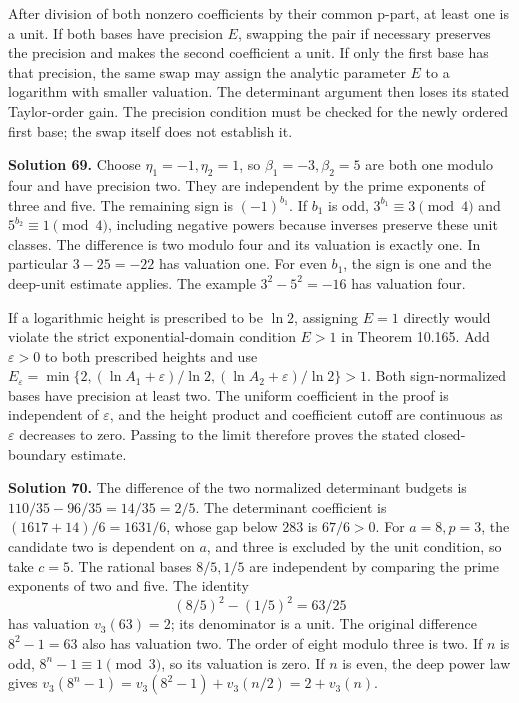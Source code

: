 \documentclass[
  11pt,
  a4paper,
]{article}
\begin{document}
After division of both nonzero coefficients by their common p-part, at
least one is a unit. If both bases have precision \(E\), swapping the
pair if necessary preserves the precision and makes the second
coefficient a unit. If only the first base has that precision, the same
swap may assign the analytic parameter \(E\) to a logarithm with smaller
valuation. The determinant argument then loses its stated Taylor-order
gain. The precision condition must be checked for the newly ordered
first base; the swap itself does not establish it.

\textbf{Solution 69.} Choose \(\eta_1=-1,\eta_2=1\), so
\(\beta_1=-3,\beta_2=5\) are both one modulo four and have precision
two. They are independent by the prime exponents of three and five. The
remaining sign is \((-1)^{b_1}\). If \(b_1\) is odd,
\(3^{b_1}\equiv3\pmod4\) and \(5^{b_2}\equiv1\pmod4\), including
negative powers because inverses preserve these unit classes. The
difference is two modulo four and its valuation is exactly one. In
particular \(3-25=-22\) has valuation one. For even \(b_1\), the sign is
one and the deep-unit estimate applies. The example \(3^2-5^2=-16\) has
valuation four.

If a logarithmic height is prescribed to be \(\ln2\), assigning \(E=1\)
directly would violate the strict exponential-domain condition \(E>1\)
in Theorem 10.165. Add \(\varepsilon>0\) to both prescribed heights and
use
\(E_\varepsilon=\min\{2,(\ln A_1+\varepsilon)/\ln2,(\ln A_2+\varepsilon)/\ln2\}>1\).
Both sign-normalized bases have precision at least two. The uniform
coefficient in the proof is independent of \(\varepsilon\), and the
height product and coefficient cutoff are continuous as \(\varepsilon\)
decreases to zero. Passing to the limit therefore proves the stated
closed-boundary estimate.

\textbf{Solution 70.} The difference of the two normalized determinant
budgets is \(110/35-96/35=14/35=2/5\). The determinant coefficient is
\((1617+14)/6=1631/6\), whose gap below \(283\) is \(67/6>0\). For
\(a=8,p=3\), the candidate two is dependent on \(a\), and three is
excluded by the unit condition, so take \(c=5\). The rational bases
\(8/5,1/5\) are independent by comparing the prime exponents of two and
five. The identity \[
(8/5)^2-(1/5)^2=63/25
\] has valuation \(v_3(63)=2\); its denominator is a unit. The original
difference \(8^2-1=63\) also has valuation two. The order of eight
modulo three is two. If \(n\) is odd, \(8^n-1\equiv1\pmod3\), so its
valuation is zero. If \(n\) is even, the deep power law gives
\(v_3(8^n-1)=v_3(8^2-1)+v_3(n/2)=2+v_3(n)\).
\end{document}
